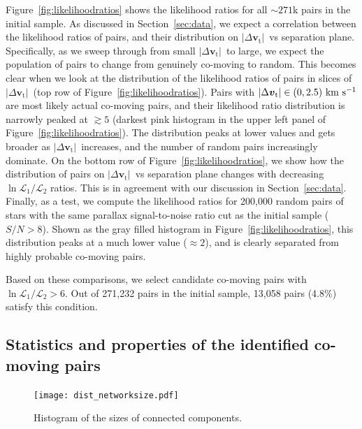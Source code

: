 \documentclass[manuscript, letterpaper]{aastex6}
\newcommand{\sectionname}{Section}
\newcommand{\bs}[1]{\boldsymbol{#1}}
\renewcommand{\vec}[1]{\bs{#1}}
\newcommand{\kms}{\ensuremath{\rm km~s^{-1}}}
\newcommand{\absdvtan}{\ensuremath{|\Delta\vec v_\mathrm{t}|}}
\begin{document}
Figure~\ref{fig:likelihoodratios} shows the likelihood ratios for all
$\sim 271$k pairs in the initial sample.
As discussed in \sectionname~\ref{sec:data}, we expect a correlation between the likelihood
ratios of pairs, and their distribution on \absdvtan\ vs separation plane.
Specifically, as we sweep through from small \absdvtan\ to large, we expect
the population of pairs to change from genuinely co-moving to random.
This becomes clear when we look at the distribution of the likelihood ratios of pairs
in slices of \absdvtan\ (top row of Figure~\ref{fig:likelihoodratios}).
Pairs with $\absdvtan \in (0,2.5)~\kms$ are most likely actual co-moving pairs, and
their likelihood ratio distribution is narrowly peaked at $\gtrsim 5$
(darkest pink histogram in the upper left panel of Figure~\ref{fig:likelihoodratios}).
The distribution peaks at lower values and gets broader as \absdvtan\ increases,
and the number of random pairs increasingly dominate.
On the bottom row of Figure~\ref{fig:likelihoodratios}, we show
how the distribution of pairs on \absdvtan\ vs separation plane changes
with decreasing $\ln \mathcal{L}_1 /\mathcal{L}_2$ ratios.
This is in agreement with our discussion in \sectionname~\ref{sec:data}.
Finally, as a test,
we compute the likelihood ratios for 200,000 random pairs of stars with the same
parallax signal-to-noise ratio cut as the initial sample ($S/N > 8$).
Shown as the gray filled histogram in Figure~\ref{fig:likelihoodratios},
this distribution peaks at a much lower value ($\approx 2$),
and is clearly separated from highly probable co-moving pairs.

Based on these comparisons, we select candidate co-moving pairs with
$\ln \mathcal{L}_1 /\mathcal{L}_2 > 6$.
Out of 271,232 pairs in the initial sample, 13,058 pairs (4.8\%)
satisfy this condition.

\subsection{Statistics and properties of the identified co-moving pairs}

\begin{figure}[htbp]
  \begin{center}
    \texttt{[image: dist\_networksize.pdf]}
  \end{center}
  \caption{%
    Histogram of the sizes of connected components.
    \label{fig:hist_ccsize}}
\end{figure}
\end{document}
